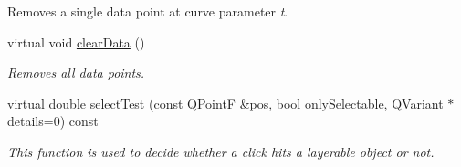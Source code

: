 \begin{DoxyCompactItemize}
\begin{DoxyCompactList}
Removes a single data point at curve parameter {\itshape t}. \end{DoxyCompactList}\item 
virtual void \hyperlink{classQCPCurve_ae0462c61dbfbac07db0736ec64110241}{clear\+Data} ()
\begin{DoxyCompactList}\small\item\em Removes all data points. \end{DoxyCompactList}\item 
virtual double \hyperlink{classQCPCurve_a5af9949e725704811bbc81ecd5970b8e}{select\+Test} (const Q\+Point\+F \&pos, bool only\+Selectable, Q\+Variant $\ast$details=0) const 
\begin{DoxyCompactList}\small\item\em This function is used to decide whether a click hits a layerable object or not. \end{DoxyCompactList}\end{DoxyCompactItemize}
